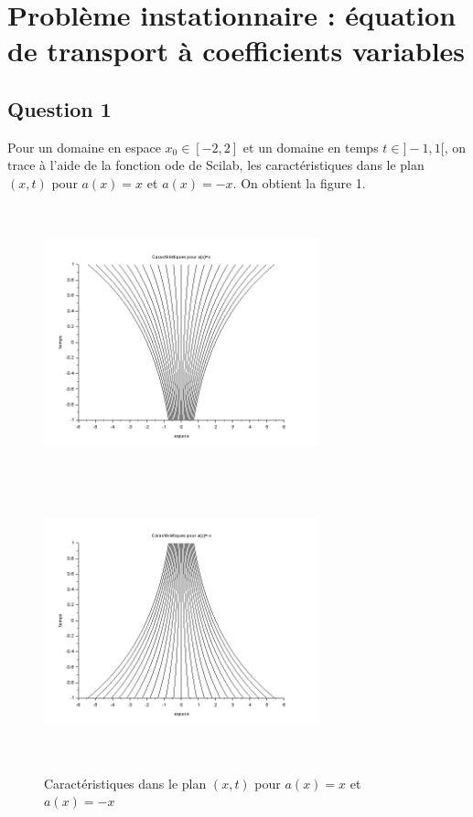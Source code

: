 \documentclass[a4paper,12pt]{article}
\begin{document}
		
 	  \setcounter{page}{1}
		
		
\section{Probl\`eme instationnaire : \'equation de transport \`a coefficients variables}
\subsection{Question 1}

Pour un domaine en espace $x_{0} \in [-2,2]$ et un domaine en temps $t \in ]-1,1[$, on trace \`a l'aide de la fonction ode de Scilab, les caract\'eristiques dans le plan $(x,t)$ pour $a(x)=x$ et $a(x)=-x$. On obtient la figure 1.
	
\begin{figure}[h!]
\begin{center}
	\includegraphics[width=225pt,height=225pt]{image/figure_0}
	\includegraphics[width=225pt,height=225pt]{image/figure_1}
\end{center}
\caption{Caract\'eristiques dans le plan $(x,t)$ pour $a(x)=x$ et $a(x)=-x$}
\label{Caract\'eristiques dans le plan $(x,t)$ pour $a(x)=x$ et $a(x)=-x$}
\end{figure}
\end{document}
